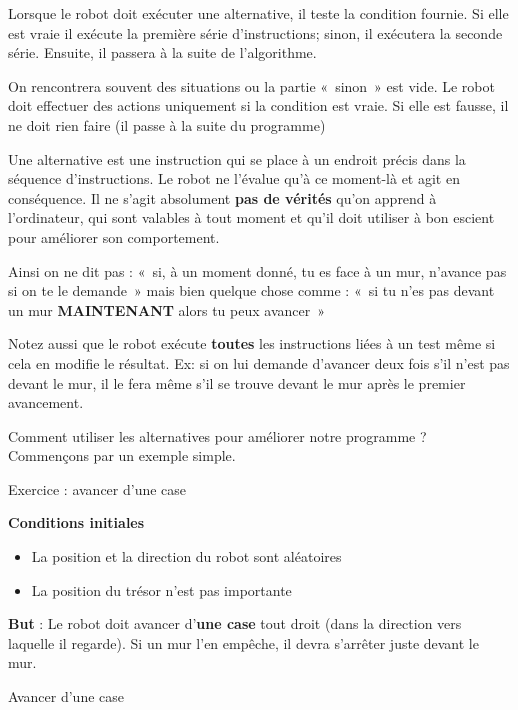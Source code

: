 	Lorsque le robot doit exécuter une alternative, il teste la condition
	fournie. Si elle est vraie il exécute la première série
	d'instructions; sinon, il exécutera la seconde série.
	Ensuite, il passera à la suite de l'algorithme.

	On rencontrera souvent des situations ou la partie «~sinon~» est vide.
	Le robot doit effectuer des actions uniquement si la condition est
	vraie. Si elle est fausse, il ne doit rien faire (il passe à la suite
	du programme)

	Une alternative est une instruction qui se place à un endroit précis
	dans la séquence d'instructions. Le robot ne
	l'évalue qu'à ce moment-là et agit en
	conséquence. Il ne s'agit absolument \textbf{pas de
	vérités} qu'on apprend à
	l'ordinateur, qui sont valables à tout moment et
	qu'il doit utiliser à bon escient pour améliorer son
	comportement.

	Ainsi on ne dit pas : «~si, à un moment donné, tu es face à un mur,
	n'avance pas si on te le demande~» mais bien quelque
	chose comme : «~si tu n'es pas devant un mur
	\textbf{MAINTENANT} alors tu peux avancer~»

	Notez aussi que le robot exécute \textbf{toutes} les instructions liées
	à un test même si cela en modifie le résultat. Ex: si on lui demande
	d'avancer deux fois s'il
	n'est pas devant le mur, il le fera même
	s'il se trouve devant le mur après le premier
	avancement.

	Comment utiliser les alternatives pour améliorer notre programme ?
	Commençons par un exemple simple.

	\begin{Emphase}{Exercice : avancer d'une case}

		\textbf{Conditions initiales}

		\begin{itemize}
		\item La position et la direction du robot sont aléatoires
		\item La position du trésor n'est pas importante
		\end{itemize}
		
		\textbf{But} : Le robot doit avancer d'\textbf{une
		case} tout droit (dans la direction vers laquelle il regarde). 
		Si un mur l'en empêche, il devra s'arrêter juste devant le mur.

	\end{Emphase}

	\begin{pseudo}{Avancer d'une case}
	\Begin
		\Else
		\EndIf
	\End
	\end{pseudo}

